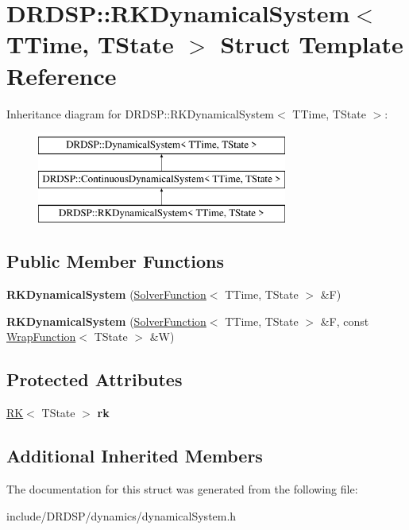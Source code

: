 \hypertarget{struct_d_r_d_s_p_1_1_r_k_dynamical_system}{\section{D\-R\-D\-S\-P\-:\-:R\-K\-Dynamical\-System$<$ T\-Time, T\-State $>$ Struct Template Reference}
\label{struct_d_r_d_s_p_1_1_r_k_dynamical_system}
}
Inheritance diagram for D\-R\-D\-S\-P\-:\-:R\-K\-Dynamical\-System$<$ T\-Time, T\-State $>$\-:\begin{figure}[H]
\begin{center}
\leavevmode
\includegraphics[height=3.000000cm]{struct_d_r_d_s_p_1_1_r_k_dynamical_system}
\end{center}
\end{figure}
\subsection*{Public Member Functions}
\begin{DoxyCompactItemize}
\item 
\hypertarget{struct_d_r_d_s_p_1_1_r_k_dynamical_system_ae255d9b0f1c755d7ddf0454e3b391489}{{\bfseries R\-K\-Dynamical\-System} (\hyperlink{struct_d_r_d_s_p_1_1_solver_function}{Solver\-Function}$<$ T\-Time, T\-State $>$ \&F)}\label{struct_d_r_d_s_p_1_1_r_k_dynamical_system_ae255d9b0f1c755d7ddf0454e3b391489}

\item 
\hypertarget{struct_d_r_d_s_p_1_1_r_k_dynamical_system_a197b71497dcdad3fc2f407752ff84679}{{\bfseries R\-K\-Dynamical\-System} (\hyperlink{struct_d_r_d_s_p_1_1_solver_function}{Solver\-Function}$<$ T\-Time, T\-State $>$ \&F, const \hyperlink{struct_d_r_d_s_p_1_1_wrap_function}{Wrap\-Function}$<$ T\-State $>$ \&W)}\label{struct_d_r_d_s_p_1_1_r_k_dynamical_system_a197b71497dcdad3fc2f407752ff84679}

\end{DoxyCompactItemize}
\subsection*{Protected Attributes}
\begin{DoxyCompactItemize}
\item 
\hypertarget{struct_d_r_d_s_p_1_1_r_k_dynamical_system_a812736deb3cefe596ddb270c76957953}{\hyperlink{struct_d_r_d_s_p_1_1_r_k}{R\-K}$<$ T\-State $>$ {\bfseries rk}}\label{struct_d_r_d_s_p_1_1_r_k_dynamical_system_a812736deb3cefe596ddb270c76957953}

\end{DoxyCompactItemize}
\subsection*{Additional Inherited Members}


The documentation for this struct was generated from the following file\-:\begin{DoxyCompactItemize}
\item 
include/\-D\-R\-D\-S\-P/dynamics/dynamical\-System.\-h\end{DoxyCompactItemize}

